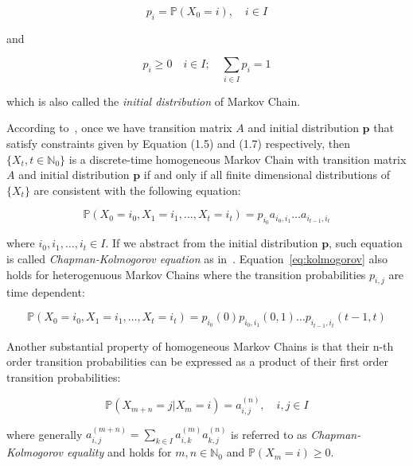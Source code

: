 \begin{equation}
p_i = \mathbb{P}(X_0=i), \quad i \in I
\end{equation}

and 

\begin{equation}
p_i \geq 0 \quad i \in I; \quad \sum\limits_{i \in I} p_i = 1
\end{equation}

\noindent which is also called the \textit{initial distribution} of Markov Chain.

According to~\citep{Praskova2012}, once we have transition matrix $A$ and initial distribution $\textbf{p}$ that satisfy constraints given by Equation (1.5) and (1.7) respectively,
then $\{X_t,t \in \mathbb{N}_0\}$ is a discrete-time homogeneous Markov Chain with transition matrix $A$ and initial distribution $\textbf{p}$ 
if and only if all finite dimensional distributions of $\{X_t\}$ are consistent with the following equation:

\begin{equation} \label{eq:kolmogorov}
    \mathbb{P}(X_{0}=i_0,X_{1}=i_1,\ldots,X_{t}=i_t) = p_{i_0} a_{i_0,i_1} \ldots a_{i_{t-1},i_t}
\end{equation}

where $i_0,i_1,\ldots,i_t \in I$. If we abstract from the initial distribution $\textbf{p}$, such equation is called \textit{Chapman-Kolmogorov equation} as in~\citep{Yin2004}.
Equation~\ref{eq:kolmogorov} also holds for heterogenuous Markov Chains where the transition probabilities $p_{i,j}$ are time dependent:

\begin{equation}
    \mathbb{P}(X_{0}=i_0,X_{1}=i_1,\ldots,X_{t}=i_t) = p_{i_0}(0) p_{i_0,i_1}(0,1) \ldots p_{i_{t-1},i_t}(t-1,t)
\end{equation}

Another substantial property of homogeneous Markov Chains is that their n-th order transition probabilities can be expressed as a product of their first order transition probabilities:

\begin{equation}
    \mathbb{P}(X_{m+n} = j|X_{m} = i) = a_{i,j}^{(n)}, \quad i,j \in I
\end{equation}

where generally $a_{i,j}^{(m+n)} = \sum\limits_{k \in I} a_{i,k}^{(m)} a_{k,j}^{(n)}$ is referred to as \textit{Chapman-Kolmogorov equality} and holds for $m,n \in \mathbb{N}_0$ and $\mathbb{P}(X_m=i) \geq 0$.~\citep{Praskova2012}

